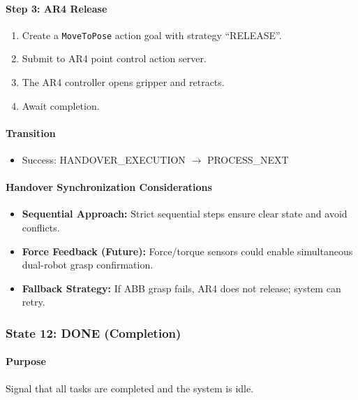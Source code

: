 \paragraph{Step 3: AR4 Release}

\begin{enumerate}
    \item Create a \texttt{MoveToPose} action goal with strategy ``RELEASE''.
    \item Submit to AR4 point control action server.
    \item The AR4 controller opens gripper and retracts.
    \item Await completion.
\end{enumerate}

\paragraph{Transition}

\begin{itemize}
    \item Success: HANDOVER\_EXECUTION $\rightarrow$ PROCESS\_NEXT
\end{itemize}

\paragraph{Handover Synchronization Considerations}

\begin{itemize}
    \item \textbf{Sequential Approach:} Strict sequential steps ensure clear state and avoid conflicts.
    \item \textbf{Force Feedback (Future):} Force/torque sensors could enable simultaneous dual-robot grasp confirmation.
    \item \textbf{Fallback Strategy:} If ABB grasp fails, AR4 does not release; system can retry.
\end{itemize}

\subsubsection{State 12: DONE (Completion)}
\label{state:done}

\paragraph{Purpose}

Signal that all tasks are completed and the system is idle.

